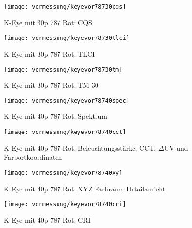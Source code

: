 \documentclass[pagesize,paper=A4,fontsize=12pt,utf8,numbers=noenddot,bibliography=totoc,listof=totoc,DIV=11,BCOR=1mm]{scrreprt}
\begin{document}
\begin{figure}[htp]     %
\centering
\texttt{[image: vormessung/keyevor78730cqs]} 
\caption {K-Eye mit 30p 787 Rot: CQS} 
\end{figure}

\begin{figure}[htp]     %
\centering
\texttt{[image: vormessung/keyevor78730tlci]} 
\caption {K-Eye mit 30p 787 Rot: TLCI} 
\end{figure}

\begin{figure}[htp]     %
\centering
\texttt{[image: vormessung/keyevor78730tm]} 
\caption {K-Eye mit 30p 787 Rot: TM-30} 
\end{figure}



\begin{figure}[htp]     %
\centering
\texttt{[image: vormessung/keyevor78740spec]} 
\caption {K-Eye mit 40p 787 Rot: Spektrum} 
\end{figure}

\begin{figure}[htp]     %
\centering
\texttt{[image: vormessung/keyevor78740cct]} 
\caption {K-Eye mit 40p 787 Rot: Beleuchtungsstärke, CCT, $\Delta$UV und Farbortkoordinaten} 
\end{figure}

\begin{figure}[htp]     %
\centering
\texttt{[image: vormessung/keyevor78740xy]} 
\caption {K-Eye mit 40p 787 Rot: XYZ-Farbraum Detailansicht} 
\end{figure}

\begin{figure}[htp]     %
\centering
\texttt{[image: vormessung/keyevor78740cri]} 
\caption {K-Eye mit 40p 787 Rot: CRI} 
\end{figure}
\end{document}
